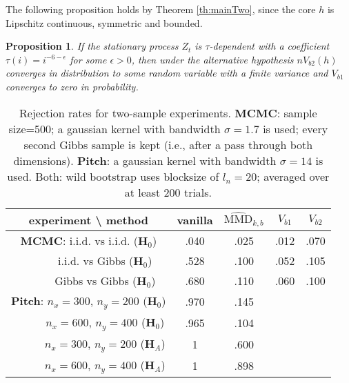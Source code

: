 \documentclass{article} %
\newtheorem{proposition}{Proposition}
\begin{document}
The following proposition holds by Theorem \ref{th:mainTwo}, since the core $h$ is  Lipschitz continuous, symmetric and bounded.
\begin{proposition}
\label{prop:alternative}
If the stationary process $Z_t$ is $\tau$-dependent with a coefficient $\tau(i) = i^{-6-\epsilon}$ for some $\epsilon>0$, then under the alternative hypothesis $n V_{b2}(h)$ converges in distribution to some random variable with a finite variance and $ V_{b1}$ converges to zero in probability. 
\end{proposition}


\begin{table}\caption{Rejection rates for two-sample experiments. {\bf MCMC}: sample size=500; a gaussian kernel with bandwidth
$\sigma=1.7$ is used; every second Gibbs sample is kept (i.e., after a pass
through both dimensions). {\bf Pitch}: a gaussian kernel with bandwidth
$\sigma=14$ is used. Both: wild bootstrap
uses blocksize of $l_n=20$; averaged over at least 200 trials.}
\label{tab:gibbs_mmd}
\centering{}
\begin{tabular}{|c|c|c|c|c|}
\hline 
{\footnotesize experiment \textbackslash{} method} & {\footnotesize vanilla} & {\footnotesize $\widehat{\text{MMD}}_{k,b}$} & {\footnotesize $V_{b1}$} & {\footnotesize $V_{b2}$}\tabularnewline
\hline 
\multicolumn{1}{|c|}{\textbf{\footnotesize MCMC}{\footnotesize : i.i.d. vs i.i.d. ($\mathbf{H}_{0}$)}} & {\small .040} & {\small .025} & {\small .012}\textbf{\small{} } & {\small .070}\tabularnewline
\hline 
{\footnotesize $\qquad\quad$i.i.d. vs Gibbs ($\mathbf{H}_{0}$)} & {\small .528 } & {\small .100} & {\small .052} & {\small .105}\tabularnewline
\hline 
{\footnotesize $\qquad\quad$Gibbs vs Gibbs ($\mathbf{H}_{0}$)} & {\small .680 } & {\small .110} & {\small .060} & {\small .100}\tabularnewline
\hline 
\textbf{\footnotesize Pitch}{\footnotesize : $n_{x}=300$, $n_{y}=200$
($\mathbf{H}_{0}$)} & {\small .970} & {\small .145} & \multicolumn{1}{c}{} & \multicolumn{1}{c}{}\tabularnewline
\cline{1-3} 
{\footnotesize $\qquad\quad n_{x}=600$, $n_{y}=400$ ($\mathbf{H}_{0}$)} & {\small .965} & {\small .104} & \multicolumn{1}{c}{} & \multicolumn{1}{c}{}\tabularnewline
\cline{1-3} 
{\footnotesize $\qquad\quad n_{x}=300$, $n_{y}=200$ ($\mathbf{H}_{A}$)} & {\small 1} & {\small .600} & \multicolumn{1}{c}{} & \multicolumn{1}{c}{}\tabularnewline
\cline{1-3} 
{\footnotesize $\qquad\quad n_{x}=600$, $n_{y}=400$ ($\mathbf{H}_{A}$)} & {\small 1} & {\small .898} & \multicolumn{1}{c}{} & \multicolumn{1}{c}{}\tabularnewline
\cline{1-3} 
\end{tabular}
\end{table}
\end{document}
